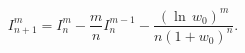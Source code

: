 \begin{equation}
I_{n+1}^{m}=I_{n}^{m}-{\frac{m}{n}}I_{n}^{m-1}-\frac{(\ln
\,w_{0})^{m}}{ n(1+w_{0})^{n}}.
\end{equation}

